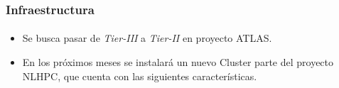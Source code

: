 \frame
{
\frametitle{Infraestructura}
\framesubtitle{}
\begin{itemize}
\item Se busca pasar de \emph{Tier-III} a \emph{Tier-II} en proyecto ATLAS.

\item En los próximos meses se instalará un nuevo Cluster parte del proyecto NLHPC, 
que cuenta con las siguientes características.

\end{itemize}
\begin{table}[h]
\centering
{}
\caption{Características del Cluster Proyecto NLHPC}
\end{table}

}